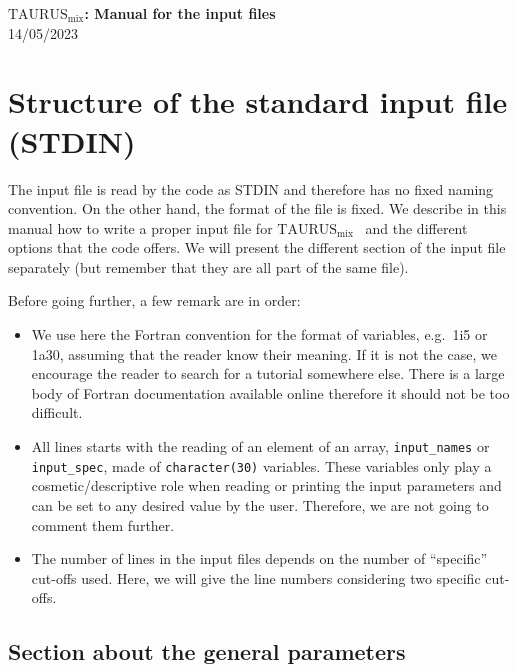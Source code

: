 \documentclass[a4paper,11pt]{article}
\newcommand{\TAURUSmix}{$\text{TAURUS}_{\text{mix}}$}
\newcommand{\ttt}[1]{\texttt{#1}}
\begin{document}
%
% 
\begin{center}
 {\LARGE \textbf{\TAURUSmix: Manual for the input files}} \\[0.20cm]
 {\large 14/05/2023}
\end{center}

%
% 
\section{Structure of the standard input file (STDIN)}

The input file is read by the code as STDIN and therefore has no fixed naming convention. 
On the other hand, the format of the file is fixed. We describe in this manual how to write a proper input file for \TAURUSmix~
and the different options that the code offers.
We will present the different section of the input file separately (but remember that they
are all part of the same file).
 
\noindent Before going further, a few remark are in order:
\begin{itemize}
  \item We use here the Fortran convention for the format of variables, e.g.\ 1i5 or 1a30, assuming that the reader
  know their meaning. If it is not the case, we encourage the reader to search for a tutorial somewhere else.
  There is a large body of Fortran documentation available online therefore it should not be too difficult.

  \item All lines starts with the reading of an element of an array, \ttt{input\_names} or \ttt{input\_spec},
  made of \ttt{character(30)} variables. 
  These variables only play a cosmetic/descriptive role when reading or printing the input parameters and can be
  set to any desired value by the user. Therefore, we are not going to comment them further.

  \item The number of lines in the input files depends on the number of ``specific'' cut-offs used. Here, we will give
  the line numbers considering two specific cut-offs.
\end{itemize}

%
%
\subsection{Section about the general parameters}
\end{document}
